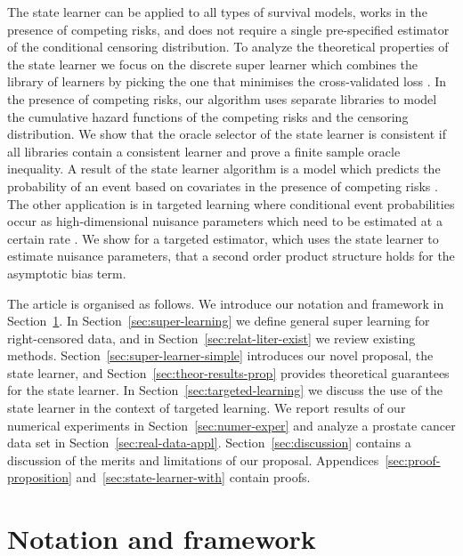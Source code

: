 \documentclass{statsoc}
\newcommand{\1}{\mathds{1}}
\begin{document}
The state learner can be applied to all types of survival models,
works in the presence of competing risks, and does not require a
single pre-specified estimator of the conditional censoring
distribution.  To analyze the theoretical properties of the state
learner we focus on the discrete super learner which combines the
library of learners by picking the one that minimises the
cross-validated loss \citep{van2007super}. In the presence of
competing risks, our algorithm uses separate libraries to model the
cumulative hazard functions of the competing risks and the censoring
distribution. We show that the oracle selector of the state learner is
consistent if all libraries contain a consistent learner and prove a
finite sample oracle inequality. A result of the state learner
algorithm is a model which predicts the probability of an event based
on covariates in the presence of competing risks
\citep{gerds2021medical}. The other application is in targeted
learning where conditional event probabilities occur as
high-dimensional nuisance parameters which need to be estimated at a
certain rate \citep{van2011targeted, rytgaard2021estimation,
  rytgaard2022targeted}. We show for a targeted estimator, which uses
the state learner to estimate nuisance parameters, that a second order
product structure holds for the asymptotic bias term.

The article is organised as follows. We introduce our notation and
framework in Section~\ref{sec:framework}. In
Section~\ref{sec:super-learning} we define general super learning
for right-censored data, and in Section~\ref{sec:relat-liter-exist}
we review existing methods.  Section~\ref{sec:super-learner-simple}
introduces our novel proposal, the state learner, and
Section~\ref{sec:theor-results-prop} provides theoretical guarantees
for the state learner. In Section~\ref{sec:targeted-learning} we
discuss the use of the state learner in the context of targeted
learning. We report results of our numerical experiments in
Section~\ref{sec:numer-exper} and analyze a prostate cancer data set
in Section~\ref{sec:real-data-appl}.  Section~\ref{sec:discussion}
contains a discussion of the merits and limitations of our
proposal. Appendices~\ref{sec:proof-proposition}
and~\ref{sec:state-learner-with} contain proofs.


\section{Notation and framework}
\label{sec:framework}
\end{document}
